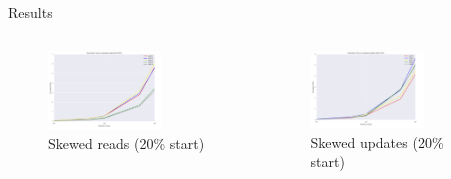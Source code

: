 \documentclass[pdf]{beamer}
\begin{document}
\begin{frame}{Results}
     \begin{columns}[T] %
     \begin{column}[T]{6cm} %
     \begin{center}
\begin{figure}[H]
\begin{center}
    \includegraphics[width=0.7\textwidth]{reads_skbeg}
    \caption{Skewed reads (20\% start)}
\end{center}
\end{figure}
	\end{center}
     \end{column}
          \begin{column}[T]{6cm} %
\begin{figure}[H]
\begin{center}
    \includegraphics[width=0.7\textwidth]{updates_skbeg}
    \caption{Skewed updates (20\% start)}
\end{center}
\end{figure}
    	\end{column}
     \end{columns}
\end{frame}
\end{document}
